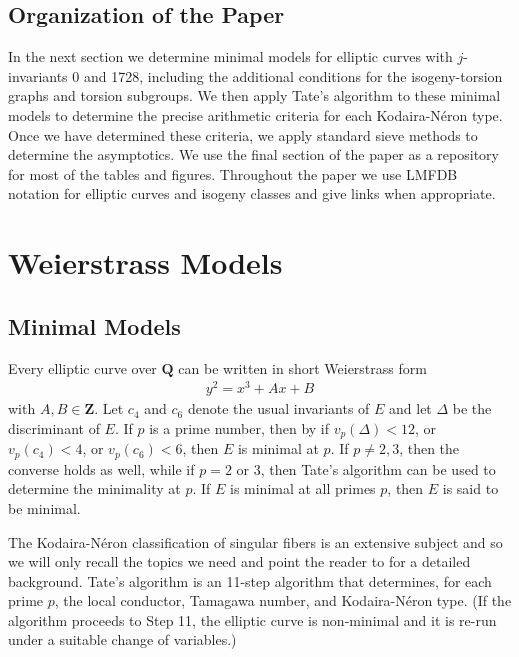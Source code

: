 \documentclass{amsart}
\newcommand{\Z}{\mathbf{Z}}
\newcommand{\Q}{\mathbf{Q}}
\numberwithin{equation}{section}
\theoremstyle{plain}
\theoremstyle{remark}
\begin{document}
\subsection{Organization of the Paper} In the next section we determine minimal models for elliptic curves with $j$-invariants 0 and 1728, including the additional conditions for the isogeny-torsion graphs and torsion subgroups.  We then apply Tate's algorithm to these minimal models to determine the precise arithmetic criteria for each Kodaira-N\'eron type.  Once we have determined these criteria, we apply standard sieve methods to determine the asymptotics.  We use the final section of the paper as a repository for most of the tables and figures.  Throughout the paper we use LMFDB \cite{lmfdb} notation for elliptic curves and isogeny classes and give links when appropriate.

\section{Weierstrass Models} \label{w_models_section}

\subsection{Minimal Models}

Every elliptic curve over $\Q$ can be written in short Weierstrass form 
\begin{align} \label{weier}
y^2 = x^3 + Ax +B
\end{align}
with $A, B \in \Z$.   Let $c_4$ and $c_6$ denote the usual invariants of $E$ and let $\Delta$ be the discriminant of $E$.  If $p$ is a prime number, then by \cite[Rmk.~1.1]{aec} if $v_p(\Delta) <12$, or $v_p(c_4)<4$, or $v_p(c_6)<6$, then $E$ is minimal at $p$.  If $p \ne 2,3$, then the converse holds as well, while if $p=2$ or $3$, then Tate's algorithm can be used to determine the minimality at $p$.  If $E$ is minimal at all primes $p$, then $E$ is said to be minimal. 

The Kodaira-N\'eron classification of singular fibers is an extensive subject and so we will only recall the topics we need and point the reader to \cite[Ch.~IV, \S9]{ataec} for a detailed background.  Tate's algorithm is an 11-step algorithm that determines, for each prime $p$, the local conductor, Tamagawa number, and Kodaira-N\'eron type.   (If the algorithm proceeds to Step 11, the elliptic curve is non-minimal and it is re-run under a suitable change of variables.)
\end{document}
